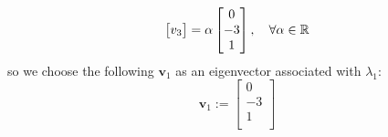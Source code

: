 \documentclass[12pt,a4paper]{article}
\begin{document}
\begin{itemize}
\begin{itemize}
\begin{equation}
\begin{bmatrix}
        v_{3} \\
      \end{bmatrix}
      =
      \alpha
      \begin{bmatrix}
        0 \\
        -3 \\
        1 \\
      \end{bmatrix},
      \quad \forall \alpha \in \mathbb{R}
    \end{equation}
    so we choose the following $\bm{v}_{1}$ as an eigenvector associated with $\lambda_{1}$:
    \begin{equation}\nonumber%
      \bm{v}_{1} := 
      \begin{bmatrix}
        0 \\
        -3 \\
        1 \\
      \end{bmatrix}
    \end{equation}


\end{itemize}
\end{itemize}
\end{document}
